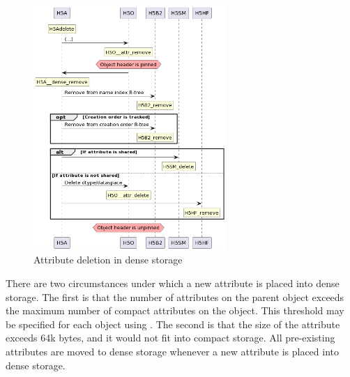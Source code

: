 \begin{figure}
    \centering
    \includegraphics[width=0.65\textwidth]{images/tour_3_uml_attr_remove_dense}
    \caption{Attribute deletion in dense storage}
    \label{fig:tour-3-uml-attr-remove-dense}
\end{figure}

There are two circumstances under which a new attribute is placed into dense storage. The first is that the number of attributes on the parent object exceeds the maximum number of compact attributes on the object. This threshold may be specified for each object using . The second is that the size of the attribute exceeds 64k bytes, and it would not fit into compact storage. All pre-existing attributes are moved to dense storage whenever a new attribute is placed into dense storage.

